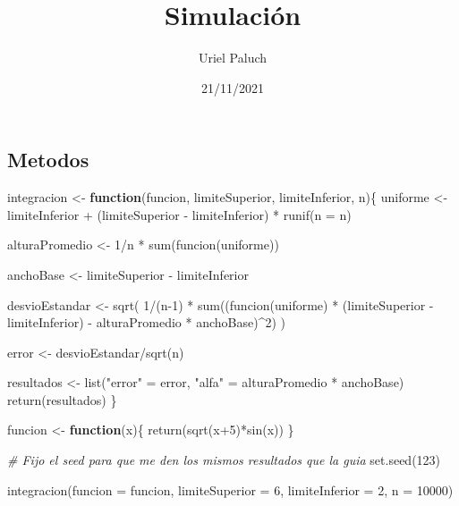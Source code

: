 \documentclass[
]{article}
\title{Simulación}
\author{Uriel Paluch}
\date{21/11/2021}
\newenvironment{Shaded}{\begin{snugshade}}{\end{snugshade}}
\newcommand{\AttributeTok}[1]{\textcolor[rgb]{0.77,0.63,0.00}{#1}}
\newcommand{\CommentTok}[1]{\textcolor[rgb]{0.56,0.35,0.01}{\textit{#1}}}
\newcommand{\ControlFlowTok}[1]{\textcolor[rgb]{0.13,0.29,0.53}{\textbf{#1}}}
\newcommand{\DecValTok}[1]{\textcolor[rgb]{0.00,0.00,0.81}{#1}}
\newcommand{\FunctionTok}[1]{\textcolor[rgb]{0.00,0.00,0.00}{#1}}
\newcommand{\NormalTok}[1]{#1}
\newcommand{\OtherTok}[1]{\textcolor[rgb]{0.56,0.35,0.01}{#1}}
\newcommand{\SpecialCharTok}[1]{\textcolor[rgb]{0.00,0.00,0.00}{#1}}
\newcommand{\StringTok}[1]{\textcolor[rgb]{0.31,0.60,0.02}{#1}}
\begin{document}
\maketitle

\hypertarget{metodos}{%
\subsection{Metodos}\label{metodos}}

\begin{Shaded}
\begin{Highlighting}[]
\NormalTok{integracion }\OtherTok{\textless{}{-}} \ControlFlowTok{function}\NormalTok{(funcion, limiteSuperior, limiteInferior, n)\{}
\NormalTok{  uniforme }\OtherTok{\textless{}{-}}\NormalTok{ limiteInferior }\SpecialCharTok{+}\NormalTok{ (limiteSuperior }\SpecialCharTok{{-}}\NormalTok{ limiteInferior) }\SpecialCharTok{*} \FunctionTok{runif}\NormalTok{(}\AttributeTok{n =}\NormalTok{ n)}
  
\NormalTok{  alturaPromedio }\OtherTok{\textless{}{-}} \DecValTok{1}\SpecialCharTok{/}\NormalTok{n }\SpecialCharTok{*} \FunctionTok{sum}\NormalTok{(}\FunctionTok{funcion}\NormalTok{(uniforme))}
  
\NormalTok{  anchoBase }\OtherTok{\textless{}{-}}\NormalTok{ limiteSuperior }\SpecialCharTok{{-}}\NormalTok{ limiteInferior}
  
\NormalTok{  desvioEstandar }\OtherTok{\textless{}{-}} \FunctionTok{sqrt}\NormalTok{( }\DecValTok{1}\SpecialCharTok{/}\NormalTok{(n}\DecValTok{{-}1}\NormalTok{) }\SpecialCharTok{*} \FunctionTok{sum}\NormalTok{((}\FunctionTok{funcion}\NormalTok{(uniforme) }\SpecialCharTok{*}\NormalTok{ (limiteSuperior }\SpecialCharTok{{-}}\NormalTok{ limiteInferior) }\SpecialCharTok{{-}}\NormalTok{ alturaPromedio }\SpecialCharTok{*}\NormalTok{ anchoBase)}\SpecialCharTok{\^{}}\DecValTok{2}\NormalTok{) )}
  
\NormalTok{  error }\OtherTok{\textless{}{-}}\NormalTok{ desvioEstandar}\SpecialCharTok{/}\FunctionTok{sqrt}\NormalTok{(n)}
  
\NormalTok{  resultados }\OtherTok{\textless{}{-}} \FunctionTok{list}\NormalTok{(}\StringTok{"error"} \OtherTok{=}\NormalTok{ error, }\StringTok{"alfa"} \OtherTok{=}\NormalTok{  alturaPromedio }\SpecialCharTok{*}\NormalTok{ anchoBase)}
  \FunctionTok{return}\NormalTok{(resultados)}
\NormalTok{\}}

\NormalTok{funcion }\OtherTok{\textless{}{-}} \ControlFlowTok{function}\NormalTok{(x)\{}
  \FunctionTok{return}\NormalTok{(}\FunctionTok{sqrt}\NormalTok{(x}\SpecialCharTok{+}\DecValTok{5}\NormalTok{)}\SpecialCharTok{*}\FunctionTok{sin}\NormalTok{(x))}
\NormalTok{\}}

\CommentTok{\# Fijo el seed para que me den los mismos resultados que la guia}
\FunctionTok{set.seed}\NormalTok{(}\DecValTok{123}\NormalTok{)}

\FunctionTok{integracion}\NormalTok{(}\AttributeTok{funcion =}\NormalTok{ funcion, }\AttributeTok{limiteSuperior =} \DecValTok{6}\NormalTok{, }\AttributeTok{limiteInferior =} \DecValTok{2}\NormalTok{, }\AttributeTok{n =} \DecValTok{10000}\NormalTok{)}
\end{Highlighting}
\end{Shaded}
\end{document}
